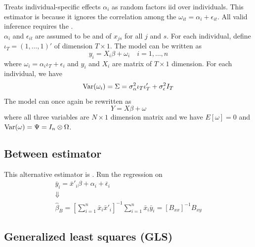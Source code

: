 Treats individual-specific effects $\alpha_i$ as random factors iid over individuals.
This estimator is  because it ignores the correlation among the $\omega_{it} = \alpha_{i}+\epsilon_{it}$.
All valid inference requires the .\\

$\alpha_i$ and $\epsilon_{it}$ are assumed to be  and  of $x_{js}$ for all $j$ and $s$.
For each individual, define $\iota_T = (1,\ldots,1)'$ of dimension $T\times 1$.
The model can be written as
\begin{equation*}
    y_i = X_i\beta + \omega_i\quad i=1,\ldots,n
\end{equation*}
where $\omega_i = \alpha_i\iota_T+\epsilon_i$ and $y_i$ and $X_i$ are matrix of $T\times 1$ dimension.
For each individual, we have 
\begin{equation*}
    \operatorname{Var}(\omega_i) = \Sigma = \sigma^2_{\alpha}\iota_T\iota'_{T} + \sigma^2_{\epsilon}I_T
\end{equation*}
The model can once again be rewritten as 
\begin{equation*}
    Y = X\beta + \omega
\end{equation*}
where all three variables are $N\times 1$ dimension matrix and we have $E[\omega] = 0$ and $\operatorname{Var}(\omega) = \Psi = I_{n}\otimes\Omega$.

\subsection{Between estimator}

This alternative estimator is . Run the regression on 
\begin{gather*}
    \bar{y}_i = \bar{x}'_{i}\beta + \alpha_i + \bar{\epsilon}_i\\
    \Downarrow\\
    \hat{\beta}_B = \left[\sum_{i=1}^{n}\bar{x}_{i}\bar{x}'_{i}\right]^{-1}\sum_{i=1}^{n}\bar{x}_{i}\bar{y}_{i} = [B_{xx}]^{-1}B_{xy}
\end{gather*}

\subsection{Generalized least squares (GLS)}

